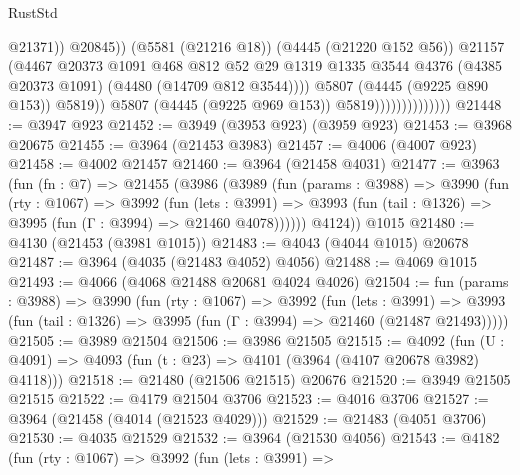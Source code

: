 \begin{lexlean}{RustStd}
\begin{coremodule}
                                              @21371))
                                          @20845))
                                      (@5581 (@21216 @18))
                                      (@4445 (@21220 @152 @56))
                                      @21157
                                      (@4467
                                        @20373
                                        @1091
                                        @468
                                        @812
                                        @52
                                        @29
                                        @1319
                                        @1335
                                        @3544
                                        @4376
                                        (@4385 @20373 @1091)
                                        (@4480 (@14709 @812 @3544))))
                                    @5807
                                    (@4445 (@9225 @890 @153))
                                    @5819))
                                @5807
                                (@4445 (@9225 @969 @153))
                                @5819))))))))))))))
@21448 := @3947 @923
@21452 := @3949 (@3953 @923) (@3959 @923)
@21453 := @3968 @20675
@21455 := @3964 (@21453 @3983)
@21457 := @4006 (@4007 @923)
@21458 := @4002 @21457
@21460 := @3964 (@21458 @4031)
@21477 := @3963
    (fun (fn : @7) =>
    @21455
      (@3986
        (@3989
          (fun (params : @3988) =>
          @3990
            (fun (rty : @1067) =>
            @3992
              (fun (lets : @3991) =>
              @3993 (fun (tail : @1326) => @3995 (fun (Γ : @3994) => @21460 @4078))))))
        @4124))
    @1015
@21480 := @4130 (@21453 (@3981 @1015))
@21483 := @4043 (@4044 @1015) @20678
@21487 := @3964 (@4035 (@21483 @4052) @4056)
@21488 := @4069 @1015
@21493 := @4066 (@4068 @21488 @20681 @4024 @4026)
@21504 := fun (params : @3988) =>
  @3990
    (fun (rty : @1067) =>
    @3992
      (fun (lets : @3991) =>
      @3993 (fun (tail : @1326) => @3995 (fun (Γ : @3994) => @21460 (@21487 @21493)))))
@21505 := @3989 @21504
@21506 := @3986 @21505
@21515 := @4092
    (fun (U : @4091) => @4093 (fun (t : @23) => @4101 (@3964 (@4107 @20678 @3982) @4118)))
@21518 := @21480 (@21506 @21515) @20676
@21520 := @3949 @21505 @21515
@21522 := @4179 @21504 @3706
@21523 := @4016 @3706
@21527 := @3964 (@21458 (@4014 (@21523 @4029)))
@21529 := @21483 (@4051 @3706)
@21530 := @4035 @21529
@21532 := @3964 (@21530 @4056)
@21543 := @4182
    (fun (rty : @1067) =>
    @3992
      (fun (lets : @3991) =>

\end{coremodule}
\end{lexlean}
